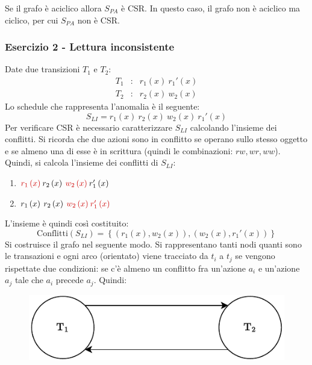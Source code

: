 \documentclass[a4paper]{article}
\begin{document}
	\noindent
	Se il grafo è aciclico allora $S_{PA}$ è CSR. In questo caso, il grafo non è aciclico ma ciclico, per cui $S_{PA}$ non è CSR.\newpage
	
	\subsubsection{Esercizio 2 - Lettura inconsistente}
	
	Date due transizioni $T_{1}$ e $T_{2}$:
	\begin{equation*}
		\begin{array}{lll}
			T_{1} &:& r_{1}\left(x\right) \: r_{1}'\left(x\right) \\
			T_{2} &:& r_{2}\left(x\right) \: w_{2}\left(x\right)
		\end{array}
	\end{equation*}
	Lo schedule che rappresenta l'anomalia è il seguente:
	\begin{equation*}
		S_{LI} = r_{1}\left(x\right) \: r_{2}\left(x\right) \: w_{2}\left(x\right) \: r_{1}'\left(x\right)
	\end{equation*}
	Per verificare CSR è necessario caratterizzare $S_{LI}$ calcolando l'insieme dei conflitti. Si ricorda che due azioni sono in conflitto se operano sullo stesso oggetto e se almeno una di esse è in scrittura (quindi le combinazioni: $rw, wr, ww$). Quindi, si calcola l'insieme dei conflitti di $S_{LI}$:
	\begin{enumerate}
		\item $\textcolor{Red3}{r_{1}\left(x\right)} \: r_{2}\left(x\right) \: \textcolor{Red3}{w_{2}\left(x\right)} \: r_{1}'\left(x\right)$
		
		\item $r_{1}\left(x\right) \: r_{2}\left(x\right) \: \textcolor{Red3}{w_{2}\left(x\right)} \: \textcolor{Red3}{r_{1}'\left(x\right)}$
	\end{enumerate}
	L'insieme è quindi così costituito:
	\begin{equation*}
		\text{Conflitti}\left(S_{LI}\right) = \left\{\left(r_{1}\left(x\right), w_{2}\left(x\right)\right), \left(w_{2}\left(x\right), r_{1}'\left(x\right)\right)\right\}
	\end{equation*}
	Si costruisce il grafo nel seguente modo. Si rappresentano tanti nodi quanti sono le transazioni e ogni arco (orientato) viene tracciato da $t_{i}$ a $t_{j}$ se vengono rispettate due condizioni: se c'è almeno un conflitto fra un'azione $a_{i}$ e un'azione $a_{j}$ tale che $a_{i}$ precede $a_{j}$. Quindi:
	\begin{figure}[!htp]
		\centering
		\includegraphics[width=.55\textwidth]{img/CSR-1.pdf}
	\end{figure}
	
\end{document}
